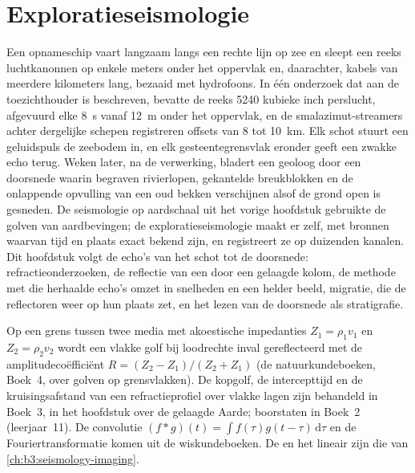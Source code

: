 \chapter{Exploratieseismologie}\label{ch:b3:exploration-seismology}

Een opnameschip vaart langzaam langs een rechte lijn op zee en sleept een reeks
luchtkanonnen op enkele meters onder het oppervlak en, daarachter, kabels van
meerdere kilometers lang, bezaaid met hydrofoons. In één onderzoek dat aan de
toezichthouder is beschreven, bevatte de reeks \num{5240} kubieke inch perslucht, afgevuurd elke
\qty{8}{s} vanaf \qty{12}{m} onder het oppervlak, en de smalazimut-streamers
achter dergelijke schepen registreren offsets van 8 tot \qty{10}{km}.
Elk schot stuurt een geluidspuls de zeebodem in, en elk gesteentegrensvlak
eronder geeft een zwakke echo terug. Weken later, na de verwerking, bladert een geoloog
door een doorsnede waarin begraven rivierlopen, gekantelde breukblokken en
de onlappende opvulling van een oud bekken verschijnen alsof de grond open is gesneden.
De seismologie op aardschaal uit het vorige hoofdstuk gebruikte de golven van
aardbevingen; de exploratieseismologie maakt er zelf, met bronnen waarvan tijd en
plaats exact bekend zijn, en registreert ze op duizenden kanalen. Dit
hoofdstuk volgt de echo's van het schot tot de doorsnede: refractieonderzoeken,
de reflectie van een  door een gelaagde kolom, de methode met 
die herhaalde echo's omzet in snelheden en een helder beeld, migratie, die
de reflectoren weer op hun plaats zet, en het lezen van de doorsnede als
stratigrafie.

\begin{recall}
Op een grens tussen twee media met akoestische impedanties $Z_1 = \rho_1v_1$ en
$Z_2 = \rho_2v_2$ wordt een vlakke golf bij loodrechte inval gereflecteerd met de
amplitudecoëfficiënt $R = (Z_2 - Z_1)/(Z_2 + Z_1)$ (de natuurkundeboeken, Boek~4,
over golven op grensvlakken). De kopgolf, de intercepttijd en de
kruisingsafstand van een refractieprofiel over vlakke lagen zijn behandeld in
Boek~3, in het hoofdstuk over de gelaagde Aarde; boorstaten in Boek~2
(leerjaar~11). De convolutie $(f*g)(t) = \int f(\tau)g(t - \tau)\,\mathrm d\tau$
en de Fouriertransformatie komen uit de wiskundeboeken. De  en het
lineair  zijn die van \cref{ch:b3:seismology-imaging}.
\end{recall}

